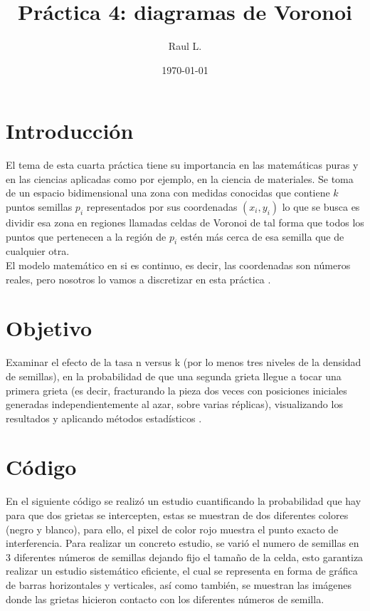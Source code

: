 \documentclass{article}
\author{Raul L.} %
\title{Pr\'{a}ctica 4: diagramas de Voronoi} %
\date{\today}
\begin{document}

\maketitle %


\section{Introducci\'{o}n}\label{intro} %



El tema de esta cuarta práctica tiene su importancia en las matemáticas puras y en las ciencias aplicadas como por ejemplo, en la ciencia de materiales. Se toma de un espacio bidimensional una zona con medidas conocidas que contiene $k$ puntos semillas $p_{i}$ representados por sus coordenadas $(x_{i},y_{i})$ lo que se busca es dividir esa zona en regiones llamadas celdas de Voronoi de tal forma que todos los puntos que pertenecen a la región de $p_{i}$ estén más cerca de esa semilla que de cualquier otra. \\
El modelo matemático en si es continuo, es decir, las coordenadas son números reales, pero nosotros lo vamos a discretizar en esta práctica \citep{ejemplo}.

\section{Objetivo}
Examinar el efecto de la tasa n versus k (por lo menos tres niveles de la densidad de semillas), en la probabilidad de que una segunda grieta llegue a tocar una primera grieta (es decir, fracturando la pieza dos veces con posiciones iniciales generadas independientemente al azar, sobre varias réplicas), visualizando los resultados y aplicando métodos estadísticos
\citep{ejemplo}.


\section{C\'{o}digo}
En el siguiente código se realizó un estudio cuantificando la probabilidad que hay para que dos grietas se intercepten, estas se muestran de dos diferentes colores (negro y blanco), para ello, el pixel de color rojo muestra el punto exacto de interferencia. Para realizar un concreto estudio, se varió el numero de semillas en 3 diferentes números de semillas dejando fijo el tamaño de la celda, esto garantiza realizar un estudio sistemático eficiente, el cual se representa en forma de gráfica de barras horizontales y verticales, así como también, se muestran las imágenes donde las grietas hicieron contacto con los diferentes números de semilla.
\end{document}
